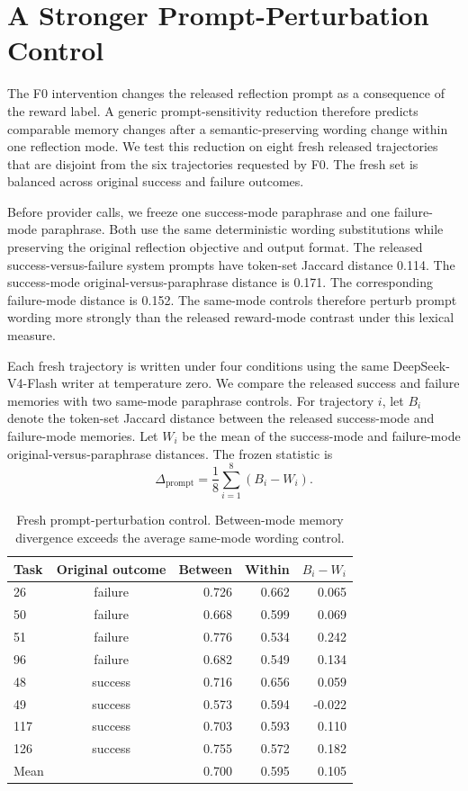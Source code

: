 \section{A Stronger Prompt-Perturbation Control}
\label{sec:prompt-control}
The F0 intervention changes the released reflection prompt as a consequence of the reward label. A generic prompt-sensitivity reduction therefore predicts comparable memory changes after a semantic-preserving wording change within one reflection mode. We test this reduction on eight fresh released trajectories that are disjoint from the six trajectories requested by F0. The fresh set is balanced across original success and failure outcomes.

Before provider calls, we freeze one success-mode paraphrase and one failure-mode paraphrase. Both use the same deterministic wording substitutions while preserving the original reflection objective and output format. The released success-versus-failure system prompts have token-set Jaccard distance 0.114. The success-mode original-versus-paraphrase distance is 0.171. The corresponding failure-mode distance is 0.152. The same-mode controls therefore perturb prompt wording more strongly than the released reward-mode contrast under this lexical measure.

Each fresh trajectory is written under four conditions using the same DeepSeek-V4-Flash writer at temperature zero. We compare the released success and failure memories with two same-mode paraphrase controls. For trajectory $i$, let $B_i$ denote the token-set Jaccard distance between the released success-mode and failure-mode memories. Let $W_i$ be the mean of the success-mode and failure-mode original-versus-paraphrase distances. The frozen statistic is
\begin{equation}
\Delta_{\mathrm{prompt}}=\frac{1}{8}\sum_{i=1}^{8}(B_i-W_i).
\end{equation}

\begin{table}[t]
\centering
\caption{Fresh prompt-perturbation control. Between-mode memory divergence exceeds the average same-mode wording control.}
\label{tab:prompt-control}
\small
\begin{tabular}{lcrrr}
\toprule
Task & Original outcome & Between & Within & $B_i-W_i$ \\
\midrule
26  & failure & 0.726 & 0.662 & 0.065 \\
50  & failure & 0.668 & 0.599 & 0.069 \\
51  & failure & 0.776 & 0.534 & 0.242 \\
96  & failure & 0.682 & 0.549 & 0.134 \\
48  & success & 0.716 & 0.656 & 0.059 \\
49  & success & 0.573 & 0.594 & -0.022 \\
117 & success & 0.703 & 0.593 & 0.110 \\
126 & success & 0.755 & 0.572 & 0.182 \\
\midrule
Mean & & 0.700 & 0.595 & 0.105 \\
\bottomrule
\end{tabular}
\end{table}

